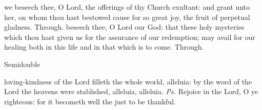 \secret
{} we beseech thee, O Lord, the offerings of thy Church exultant: and grant unto her, on whom thou hast bestowed cause for so great joy, the fruit of perpetual gladness. Through.
\postcommunion
{} beseech thee, O Lord our God: that these holy mysteries which thou hast given us for the assurance of our redemption; may avail for our healing both in this life and in that which is to come. Through.

\label{EasterII}
\begin{inhead}
    {Semidouble}
\end{inhead}
\par\noindent
{}

\introit
{} loving-kindness of the Lord filleth the whole world, alleluia: by the word of the Lord the heavens were stablished, alleluia, alleluia. \textit{Ps.} Rejoice in the Lord, O ye righteous: for it becometh well the just to be thankful.

